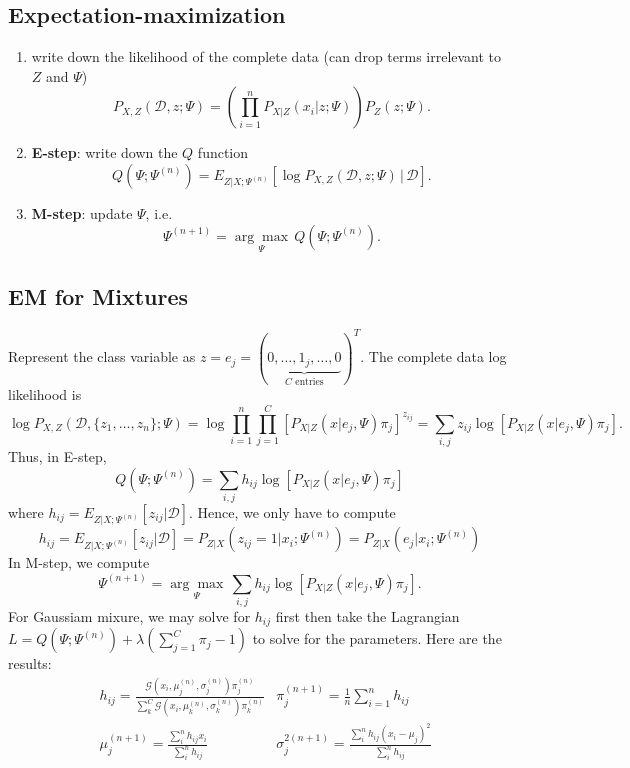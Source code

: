 \documentclass{article}
\newenvironment{topic}[1]{\subsection*{#1}}{}
\newcommand*{\G}{\mathcal{G}}
\newcommand*{\D}{\mathcal{D}}
\begin{document}
\pagebreak

\begin{topic}{Expectation-maximization}
    \begin{enumerate}
        \item write down the likelihood of the complete data (can drop terms irrelevant to $Z$ and $\Psi$)
                \[
                    P_{X, Z}(\D, z; \Psi) = \left(\prod_{i = 1}^n P_{X| Z}(x_i| z; \Psi)\right)P_Z(z; \Psi).
                \]
        \item \textbf{E-step}: write down the $Q$ function
                \[
                    Q(\Psi; \Psi^{(n)}) = E_{Z|X;\Psi^{(n)}}[\log P_{X, Z}(\D, z; \Psi) \, | \, \D].
                \]
        \item \textbf{M-step}: update $\Psi$, i.e.
                \[
                    \Psi^{(n + 1)} = \underset{\Psi}{\arg \max} \, Q(\Psi; \Psi^{(n)}).
                \]
    \end{enumerate}
\end{topic}

\begin{topic}{EM for Mixtures}
    Represent the class variable as $z = e_j = (\underbrace{0, \ldots, 1_j, \ldots, 0}_{C \text{ entries}})^T$. The complete data log likelihood is 
    \[
        \log P_{X, Z}(\D, \{z_1, \dots, z_n\}; \Psi) = \log \prod_{i = 1}^n \prod_{j = 1}^C [P_{X|Z}(x|e_j, \Psi)\pi_j]^{z_{ij}} = \sum_{i, j} z_{ij} \log [P_{X|Z}(x|e_j, \Psi)\pi_j].
    \]
    Thus, in E-step,
    \[
        Q(\Psi; \Psi^{(n)}) = \sum_{i, j} h_{ij}\log [P_{X|Z}(x|e_j, \Psi)\pi_j]
    \]
    where $h_{ij} = E_{Z|X;\Psi^{(n)}}[z_{ij}|\D]$. Hence, we only have to compute
    \[
        h_{ij} = E_{Z|X;\Psi^{(n)}}[z_{ij}|\D] = P_{Z|X}(z_{ij} = 1|x_i; \Psi^{(n)}) = P_{Z|X}(e_j|x_i; \Psi^{(n)})
    \]
    In M-step, we compute
    \[
        \Psi^{(n + 1)} = \underset{\Psi}{\arg \max} \, \sum_{i, j} h_{ij}\log [P_{X|Z}(x|e_j, \Psi)\pi_j].
    \]
    For Gaussiam mixure, we may solve for $h_{ij}$ first then take the Lagrangian 
    $L = Q(\Psi; \Psi^{(n)}) + \lambda\left(\sum_{j = 1}^C \pi_j - 1\right)$
    to solve for the parameters. Here are the results:
    \begin{align*}
        &h_{ij} = \frac{\G\left(x_i, \mu_j^{(n)}, \sigma_j^{(n)}\right)\pi_j^{(n)}}{\sum_k^C \G\left(x_i, \mu_k^{(n)}, \sigma_k^{(n)}\right)\pi_k^{(n)}}
        &\pi_j^{(n + 1)} = \frac{1}{n}\sum_{i = 1}^n h_{ij} \\
        &\mu_j^{(n + 1)} = \frac{\sum_{i}^n h_{ij}x_i}{\sum_{i}^n h_{ij}}
        &\sigma^{2(n + 1)}_j = \frac{\sum_{i}^n h_{ij}(x_i - \mu_j)^2}{\sum_{i}^n h_{ij}}
    \end{align*}
\end{topic}
\end{document}
